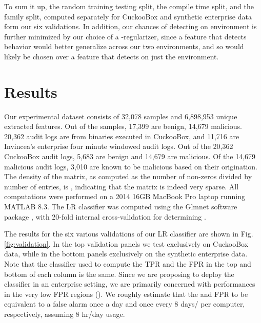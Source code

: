 \documentclass{sig-alternate-2013}
\begin{document}
To sum it up, the random training testing split, the compile time split, and the family split, computed separately for CuckooBox and synthetic enterprise data form our six validations. In addition, our chances of detecting on environment is further minimized by our choice of a -regularizer, since a feature that detects behavior would better generalize across our two environments, and so would likely be chosen over a feature that detects on just the environment.

\section{Results}
\label{sec:result}

Our experimental dataset consists of 32,078 samples and 6,898,953 unique extracted features.  Out of the samples, 17,399 are benign, 14,679 malicious. 20,362 audit logs are from binaries executed in CuckooBox, and 11,716 are Invincea's enterprise four minute windowed audit logs. Out of the 20,362 CuckooBox audit logs, 5,683 are benign and 14,679 are malicious. Of the 14,679 malicious audit logs, 3,010 are known to be malicious based on their origination. The density of the  matrix, as computed as the number of non-zeros divided by number of entries, is , indicating that the matrix is indeed very sparse. All computations were performed on a 2014 16GB MacBook Pro laptop running MATLAB 8.3. The LR classifier was computed using the Glmnet software package \cite{friedman2regularization,qian2013glmnet}, with 20-fold internal cross-validation for determining .

The results for the six various validations of our LR classifier are shown in Fig. \ref{fig:validation}. In the top validation panels we test exclusively on CuckooBox data, while in the bottom panels exclusively on the synthetic enterprise data. Note that the classifier used to compute the TPR and the FPR in the top and bottom of each column is the same. Since we are proposing to deploy the classifier in an enterprise setting, we are primarily concerned with performances in the very low FPR regions (). We roughly estimate that the  and  FPR to be equivalent to a false alarm once a day and once every 8 days/ per computer, respectively, assuming 8 hr/day usage.
\end{document}
